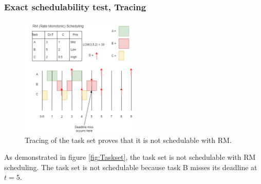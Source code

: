             \subsubsection{Exact schedulability test, Tracing}
            \begin{figure}[H]
                \centering
                \includegraphics[width=0.5\textwidth]{images/Ass1Q2.drawio.png}
                \caption{Tracing of the task set proves that it is not schedulable with RM.}
                \label{fig:tracing}
            \end{figure}

            As demonstrated in figure \ref{fig:Taskset}, the task set is not schedulable with RM scheduling. The task set is not schedulable because task B misses its deadline at $t = 5$.

